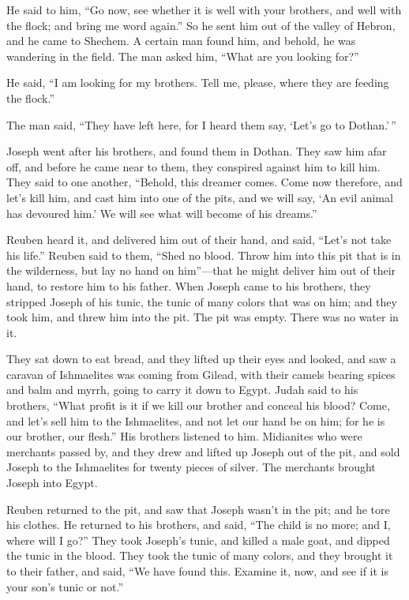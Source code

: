  He said to him, ``Go now, see whether it is well with your
brothers, and well with the flock; and bring me word again.'' So he sent
him out of the valley of Hebron, and he came to Shechem.  A
certain man found him, and behold, he was wandering in the field. The
man asked him, ``What are you looking for?''

 He said, ``I am looking for my brothers. Tell me, please,
where they are feeding the flock.''

 The man said, ``They have left here, for I heard them say,
`Let's go to Dothan.'\,''

Joseph went after his brothers, and found them in Dothan. 
They saw him afar off, and before he came near to them, they conspired
against him to kill him.  They said to one another,
``Behold, this dreamer comes.  Come now therefore, and
let's kill him, and cast him into one of the pits, and we will say, `An
evil animal has devoured him.' We will see what will become of his
dreams.''

 Reuben heard it, and delivered him out of their hand, and
said, ``Let's not take his life.''  Reuben said to them,
``Shed no blood. Throw him into this pit that is in the wilderness, but
lay no hand on him''---that he might deliver him out of their hand, to
restore him to his father.  When Joseph came to his
brothers, they stripped Joseph of his tunic, the tunic of many colors
that was on him;  and they took him, and threw him into the
pit. The pit was empty. There was no water in it.

 They sat down to eat bread, and they lifted up their eyes
and looked, and saw a caravan of Ishmaelites was coming from Gilead,
with their camels bearing spices and balm and myrrh, going to carry it
down to Egypt.  Judah said to his brothers, ``What profit
is it if we kill our brother and conceal his blood?  Come,
and let's sell him to the Ishmaelites, and not let our hand be on him;
for he is our brother, our flesh.'' His brothers listened to him.
 Midianites who were merchants passed by, and they drew and
lifted up Joseph out of the pit, and sold Joseph to the Ishmaelites for
twenty pieces of silver. The merchants brought Joseph into Egypt.

 Reuben returned to the pit, and saw that Joseph wasn't in
the pit; and he tore his clothes.  He returned to his
brothers, and said, ``The child is no more; and I, where will I go?''
 They took Joseph's tunic, and killed a male goat, and
dipped the tunic in the blood.  They took the tunic of many
colors, and they brought it to their father, and said, ``We have found
this. Examine it, now, and see if it is your son's tunic or not.''


